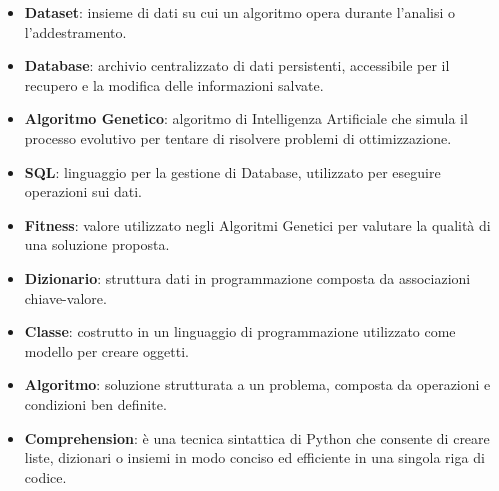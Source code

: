 \documentclass{article}
\begin{document}
\begin{itemize}


    \item\textbf{Dataset}: insieme di dati su cui un algoritmo opera durante l'analisi o l'addestramento.

    \item\textbf{Database}: archivio centralizzato di dati persistenti, accessibile per il recupero e la modifica delle informazioni salvate.

    \item\textbf{Algoritmo Genetico}: algoritmo di Intelligenza Artificiale che simula il processo evolutivo per tentare di risolvere problemi di ottimizzazione.

    \item\textbf{SQL}: linguaggio per la gestione di Database, utilizzato per eseguire operazioni sui dati.

    \item\textbf{Fitness}: valore utilizzato negli Algoritmi Genetici per valutare la qualità di una soluzione proposta.

    \item\textbf{Dizionario}: struttura dati in programmazione composta da associazioni chiave-valore.

    \item\textbf{Classe}: costrutto in un linguaggio di programmazione utilizzato come modello per creare oggetti.

    \item\textbf{Algoritmo}: soluzione strutturata a un problema, composta da operazioni e condizioni ben definite.
    
    \item\textbf{Comprehension}: è una tecnica sintattica di Python che consente di creare liste, dizionari o insiemi in modo conciso ed efficiente in una singola riga di codice.

\end{itemize}


\printindex
\end{document}
